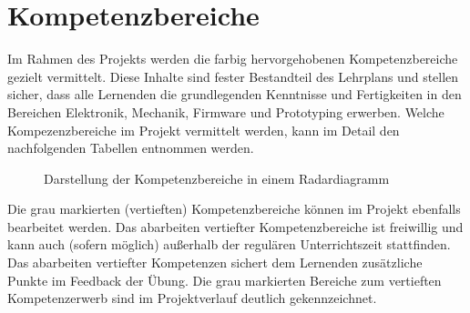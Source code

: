 \section*{Kompetenzbereiche}

Im Rahmen des Projekts werden die farbig hervorgehobenen Kompetenzbereiche gezielt vermittelt. Diese Inhalte sind fester Bestandteil des Lehrplans und stellen sicher, dass alle Lernenden die grundlegenden Kenntnisse und Fertigkeiten in den Bereichen Elektronik, Mechanik, Firmware und Prototyping erwerben. Welche Kompezenzbereiche im Projekt vermittelt werden, kann im Detail den nachfolgenden Tabellen entnommen werden.

\vspace{-10pt}

\begin{figure}[ht]
  \centering
  \begin{tikzpicture}[scale=1.25]
    
  \end{tikzpicture}
  \caption{Darstellung der Kompetenzbereiche in einem Radardiagramm}
  \label{fig:kompetenzbereiche-radardiagramm}
\end{figure}

Die grau markierten (vertieften) Kompetenzbereiche können im Projekt ebenfalls bearbeitet werden. Das abarbeiten vertiefter Kompetenzbereiche ist freiwillig und kann auch (sofern möglich) außerhalb der regulären Unterrichtszeit stattfinden. Das abarbeiten vertiefter Kompetenzen sichert dem Lernenden zusätzliche Punkte im Feedback der Übung. Die grau markierten Bereiche zum vertieften Kompetenzerwerb sind im Projektverlauf deutlich gekennzeichnet.

\thispagestyle{empty}
\newpage

\renewcommand{\do}[1]{\showCompetenceTable{#1}}
\expandafter\docsvlist\expandafter{\categories}
